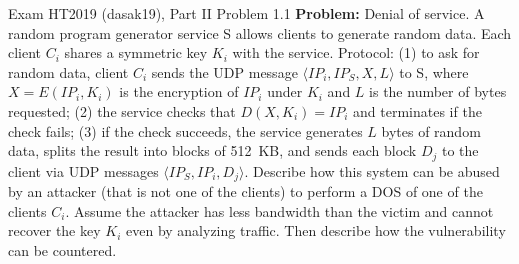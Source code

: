 \documentclass[12pt, a4paper]{article}
\begin{document}
\begin{practicebox}{Exam HT2019 (dasak19), Part II Problem 1.1}
\textbf{Problem:} Denial of service. A random program generator service S allows clients to generate random data. Each client $C_i$ shares a symmetric key $K_i$ with the service. Protocol: (1) to ask for random data, client $C_i$ sends the UDP message $\langle IP_i, IP_S, X, L \rangle$ to S, where $X = E(IP_i, K_i)$ is the encryption of $IP_i$ under $K_i$ and $L$ is the number of bytes requested; (2) the service checks that $D(X, K_i) = IP_i$ and terminates if the check fails; (3) if the check succeeds, the service generates $L$ bytes of random data, splits the result into blocks of 512~KB, and sends each block $D_j$ to the client via UDP messages $\langle IP_S, IP_i, D_j \rangle$. Describe how this system can be abused by an attacker (that is not one of the clients) to perform a DOS of one of the clients $C_i$. Assume the attacker has less bandwidth than the victim and cannot recover the key $K_i$ even by analyzing traffic. Then describe how the vulnerability can be countered.


\end{practicebox}
\end{document}
